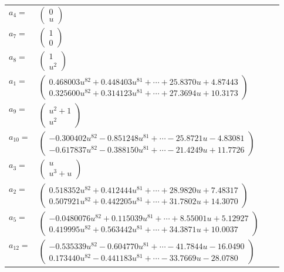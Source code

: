 \documentclass[1p]{elsarticle_modified}
\theoremstyle{definition}
\begin{document}
\begin{tabular}{m{7pt} m{180pt} m{7pt} m{180pt} }
\flushright $a_{4}=$&$\begin{pmatrix}0\\u\end{pmatrix}$ \\
\flushright $a_{7}=$&$\begin{pmatrix}1\\0\end{pmatrix}$ \\
\flushright $a_{8}=$&$\begin{pmatrix}1\\u^2\end{pmatrix}$ \\
\flushright $a_{1}=$&$\begin{pmatrix}0.468003 u^{82}+0.448403 u^{81}+\cdots+25.8370 u+4.87443\\0.325600 u^{82}+0.314123 u^{81}+\cdots+27.3694 u+10.3173\end{pmatrix}$ \\
\flushright $a_{9}=$&$\begin{pmatrix}u^2+1\\u^2\end{pmatrix}$ \\
\flushright $a_{10}=$&$\begin{pmatrix}-0.300402 u^{82}-0.851248 u^{81}+\cdots-25.8721 u-4.83081\\-0.617837 u^{82}-0.388150 u^{81}+\cdots-21.4249 u+11.7726\end{pmatrix}$ \\
\flushright $a_{3}=$&$\begin{pmatrix}u\\u^3+u\end{pmatrix}$ \\
\flushright $a_{2}=$&$\begin{pmatrix}0.518352 u^{82}+0.412444 u^{81}+\cdots+28.9820 u+7.48317\\0.507921 u^{82}+0.442205 u^{81}+\cdots+31.7802 u+14.3070\end{pmatrix}$ \\
\flushright $a_{5}=$&$\begin{pmatrix}-0.0480076 u^{82}+0.115039 u^{81}+\cdots+8.55001 u+5.12927\\0.419995 u^{82}+0.563442 u^{81}+\cdots+34.3871 u+10.0037\end{pmatrix}$ \\
\flushright $a_{12}=$&$\begin{pmatrix}-0.535339 u^{82}-0.604770 u^{81}+\cdots-41.7844 u-16.0490\\0.173440 u^{82}-0.441183 u^{81}+\cdots-33.7669 u-28.0780\end{pmatrix}$ \\

\end{tabular}
\end{document}
